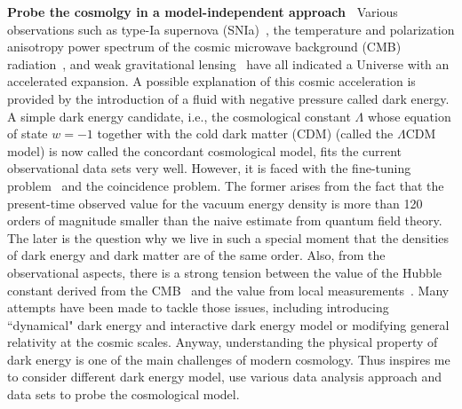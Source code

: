 \documentclass[11pt,letterpaper,sans]{moderncv}   %
\begin{document}
\vspace{2mm}
\textcolor{color1}{\textbf{Probe the cosmolgy in a model-independent approach~\cite{Cai:2015zoa,Cai:2015pia,Cai:2016vmn}}}
Various observations such as type-Ia supernova (SNIa)~\cite{Riess:1998cb,Perlmutter:1998np,Suzuki:2011hu,Betoule:2014frx}, the temperature and polarization anisotropy power spectrum of the cosmic microwave background (CMB) radiation~\cite{Hinshaw:2012aka,Ade:2015xua}, and weak gravitational lensing~\cite{Kilbinger:2008gk} have all indicated a Universe with an accelerated expansion. A possible explanation of this cosmic acceleration is provided by the introduction of a fluid with negative pressure called dark energy. A simple dark energy candidate, i.e., the cosmological constant $\Lambda$ whose equation of state $w =-1$ together with the cold dark matter (CDM) (called the $\Lambda$CDM model) is now called the  concordant cosmological model, fits the current observational data sets very well. However, it is faced with the fine-tuning problem~\cite{Weinberg:2000yb} and the coincidence problem. The former arises from the fact that the present-time observed value for the vacuum energy density is more than 120 orders of magnitude smaller than the naive estimate from quantum field theory. The later is the question why we live in such a special moment that the densities of dark energy and dark matter are of the same order.
Also, from the observational aspects, there is a strong tension between the value of the Hubble constant derived from the CMB~\cite{Ade:2015xua} and the value from local measurements~\cite{Riess:2011yx}. Many attempts have been made to tackle those issues, including introducing ``dynamical" dark energy and interactive dark energy model or modifying general relativity at the cosmic scales. Anyway, understanding the physical property of dark energy is one of the main challenges of modern cosmology. Thus inspires me to consider different dark energy model, use various data analysis approach and data sets to probe the cosmological model.
\end{document}

